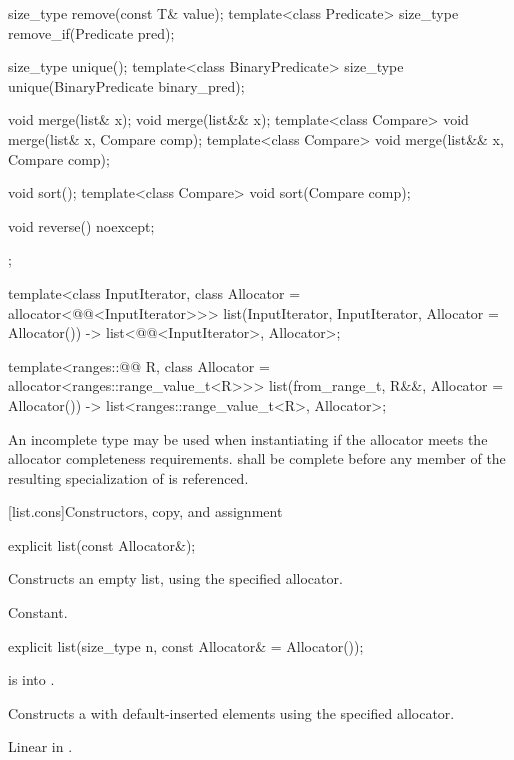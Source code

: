 \begin{codeblock}
{{    size_type remove(const T& value);
    template<class Predicate> size_type remove_if(Predicate pred);

    size_type unique();
    template<class BinaryPredicate>
      size_type unique(BinaryPredicate binary_pred);

    void merge(list& x);
    void merge(list&& x);
    template<class Compare> void merge(list& x, Compare comp);
    template<class Compare> void merge(list&& x, Compare comp);

    void sort();
    template<class Compare> void sort(Compare comp);

    void reverse() noexcept;
  };

  template<class InputIterator, class Allocator = allocator<@@<InputIterator>>>
    list(InputIterator, InputIterator, Allocator = Allocator())
      -> list<@@<InputIterator>, Allocator>;

  template<ranges::@@ R, class Allocator = allocator<ranges::range_value_t<R>>>
    list(from_range_t, R&&, Allocator = Allocator())
      -> list<ranges::range_value_t<R>, Allocator>;
}
\end{codeblock}

\pnum
An incomplete type  may be used when instantiating 
if the allocator meets the
allocator completeness requirements.
 shall be complete before any member of the resulting specialization
of  is referenced.

[list.cons]{Constructors, copy, and assignment}

%
\begin{itemdecl}
explicit list(const Allocator&);
\end{itemdecl}

\begin{itemdescr}
\pnum
\effects
Constructs an empty list, using the specified allocator.

\pnum
\complexity
Constant.
\end{itemdescr}

%
\begin{itemdecl}
explicit list(size_type n, const Allocator& = Allocator());
\end{itemdecl}

\begin{itemdescr}
\pnum
\expects
{} is  into .

\pnum
\effects
Constructs a  with
 default-inserted elements using the specified allocator.

\pnum
\complexity
Linear in
.
\end{itemdescr}

